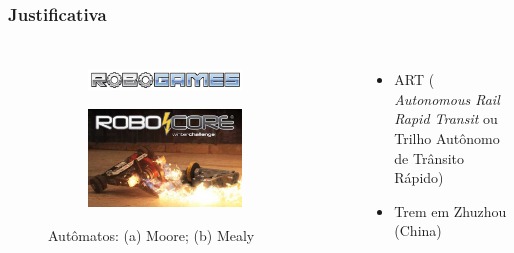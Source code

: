 \begin{frame}
\frametitle{Justificativa}
\begin{columns}[c]

	\begin{figure}[h]
     \centering
     \captionsetup{width=0.85\textwidth,font=footnotesize,textfont=bf}
     \begin{subfigure}[b]{\textwidth}
 	\centering
         \includegraphics[width=0.85\textwidth,height=\textheight,keepaspectratio]{Figuras/robogames.jpg}
         \caption{\centering \label{fig:fss}}
     \end{subfigure}
     
     \begin{subfigure}[b]{\textwidth}
 	\centering
         \includegraphics[width=0.85\textwidth,height=5\textheight,keepaspectratio]{Figuras/winterlogo.jpg}
         \caption{\centering \label{fig:vdd}}
     \end{subfigure}
	\caption{Autômatos: (a) Moore; (b) Mealy}
 \end{figure}
	\pause
	\begin{itemize}
	\item ART (\textit{ Autonomous Rail Rapid Transit} ou Trilho Autônomo de Trânsito 	Rápido)
	\item Trem em Zhuzhou (China)
	\end{itemize}


\end{columns}
\end{frame}
